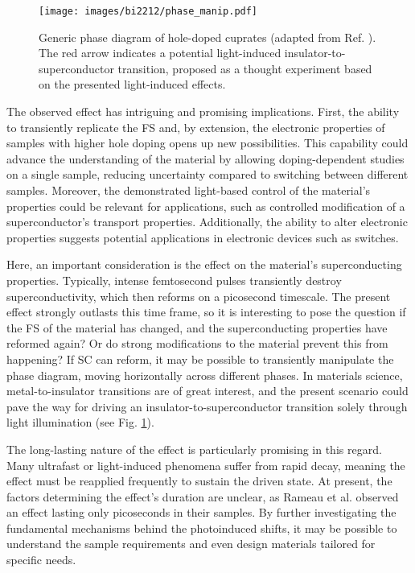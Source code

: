 \begin{figure}[t!]
	\centering
	\texttt{[image: images/bi2212/phase\_manip.pdf]}
	\caption{Generic phase diagram of hole-doped cuprates (adapted from Ref. \cite{keimer_quantum_2015}). The red arrow indicates a potential light-induced insulator-to-superconductor transition, proposed as a thought experiment based on the presented light-induced effects.}
	\label{fig:phasemanip}
\end{figure}

The observed effect has intriguing and promising implications.
First, the ability to transiently replicate the FS and, by extension, the electronic properties of samples with higher hole doping opens up new possibilities.
This capability could advance the understanding of the material by allowing doping-dependent studies on a single sample, reducing uncertainty compared to switching between different samples.
Moreover, the demonstrated light-based control of the material's properties could be relevant for applications, such as controlled modification of a superconductor’s transport properties.
Additionally, the ability to alter electronic properties suggests potential applications in electronic devices such as switches.

Here, an important consideration is the effect on the material’s superconducting properties.
Typically, intense femtosecond pulses transiently destroy superconductivity, which then reforms on a picosecond timescale.
The present effect strongly outlasts this time frame, so it is interesting to pose the question if the FS of the material has changed, and the superconducting properties have reformed again?
Or do strong modifications to the material prevent this from happening?
If SC can reform, it may be possible to transiently manipulate the phase diagram, moving horizontally across different phases.
In materials science, metal-to-insulator transitions are of great interest, and the present scenario could pave the way for driving an insulator-to-superconductor transition solely through light illumination (see Fig. \ref{fig:phasemanip}).

The long-lasting nature of the effect is particularly promising in this regard.
Many ultrafast or light-induced phenomena suffer from rapid decay, meaning the effect must be reapplied frequently to sustain the driven state.
At present, the factors determining the effect’s duration are unclear, as Rameau et al. \cite{rameau_photoinduced_2014} observed an effect lasting only picoseconds in their samples.
By further investigating the fundamental mechanisms behind the photoinduced shifts, it may be possible to understand the sample requirements and even design materials tailored for specific needs.
